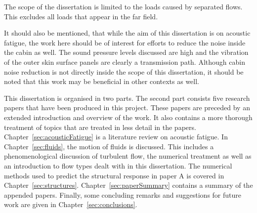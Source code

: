 The scope of the dissertation is limited to the loads caused by separated flows. This excludes all loads that appear in the far field. %

It should also be mentioned, that while the aim of this dissertation is on acoustic fatigue, the work here should be of interest for efforts to reduce the noise inside the cabin as well. The sound pressure levels discussed are high and the vibration of the outer skin surface panels are clearly a transmission path. Although cabin noise reduction is not directly inside the scope of this dissertation, it should be noted that this work may be beneficial in other contexts as well. 

This dissertation is organised in two parts. The second part consists five research papers that have been produced in this project. These papers are preceded by an extended introduction and overview of the work. It also contains a more thorough treatment of topics that are treated in less detail in the papers. Chapter~\ref{sec:acousticFatigue} is a literature review on acoustic fatigue. In Chapter~\ref{sec:fluids}, the motion of fluids is discussed. This includes a phenomenological discussion of turbulent flow, the numerical treatment as well as an introduction to flow types dealt with in this dissertation. The numerical methods used to predict the structural response in paper A is covered in Chapter~\ref{sec:structures}. Chapter~\ref{sec:paperSummary} contains a summary of the appended papers. Finally, some concluding remarks and suggestions for future work are given in Chapter~\ref{sec:conclusions}.






